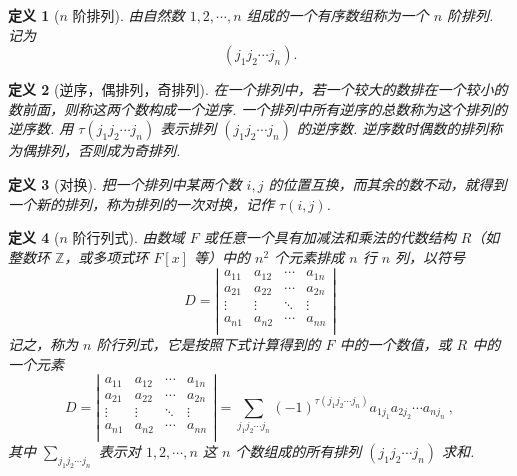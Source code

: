 \documentclass[zihao=-4,UTF8,linespread=1.8,nothm]{aytony_base}
\newtheorem{definition}{\indent 定义}[subsection]
\begin{document}
\begin{definition}[$n$ 阶排列]
    由自然数 $1, 2, \cdots, n$ 组成的一个有序数组称为一个 $n$ 阶排列. 记为 $$
        (j_1j_2\cdots j_n).
    $$
\end{definition}

\begin{definition}[逆序，偶排列，奇排列]
    在一个排列中，若一个较大的数排在一个较小的数前面，则称这两个数构成一个逆序. 一个排列中所有逆序的总数称为这个排列的逆序数. 用 $\tau (j_1j_2\cdots j_n)$ 表示排列 $(j_1j_2\cdots j_n)$ 的逆序数. 逆序数时偶数的排列称为偶排列，否则成为奇排列.
\end{definition}

\begin{definition}[对换]
    把一个排列中某两个数 $i, j$ 的位置互换，而其余的数不动，就得到一个新的排列，称为排列的一次对换，记作 $\tau(i, j)$.
\end{definition}

\begin{definition}[$n$ 阶行列式]
    由数域 $F$ 或任意一个具有加减法和乘法的代数结构 $R$（如整数环 $\mathbb{Z}$，或多项式环 $F[x]$ 等）中的 $n^2$ 个元素排成 $n$ 行 $n$ 列，以符号 $$
        D = \left|
        \begin{matrix}
            a_{11} & a_{12} & \cdots & a_{1n} \\
            a_{21} & a_{22} & \cdots & a_{2n} \\
            \vdots & \vdots & \ddots & \vdots \\
            a_{n1} & a_{n2} & \cdots & a_{nn} \\
        \end{matrix}
        \right|
    $$ 记之，称为 $n$ 阶行列式，它是按照下式计算得到的 $F$ 中的一个数值，或 $R$ 中的一个元素 $$
        D = \left|
        \begin{matrix}
            a_{11} & a_{12} & \cdots & a_{1n} \\
            a_{21} & a_{22} & \cdots & a_{2n} \\
            \vdots & \vdots & \ddots & \vdots \\
            a_{n1} & a_{n2} & \cdots & a_{nn} \\
        \end{matrix}
        \right| = \sum_{j_1j_2\cdots j_n}
        (-1)^{\tau(j_1j_2\cdots j_n)}a_{1j_1}a_{2j_2}\cdots a_{nj_n}\ ,
    $$ 其中 $\sum\limits_{j_1j_2\cdots j_n}^{}$ 表示对 $1, 2, \cdots, n$ 这 $n$ 个数组成的所有排列 $(j_1j_2\cdots j_n)$ 求和.
\end{definition}
\end{document}
